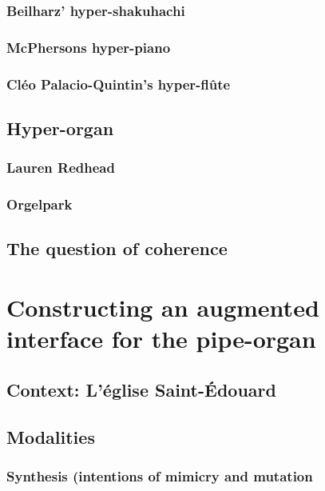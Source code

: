 \documentclass[12pt,twoside,maitrise]{dms}
\theoremstyle{definition}
\begin{document}
\subsection{Beilharz' hyper-shakuhachi}

\subsection{McPhersons hyper-piano}

\subsection{Cléo Palacio-Quintin's hyper-flûte}

\section{Hyper-organ}

\subsection{Lauren Redhead}

\subsection{Orgelpark}

\section{The question of coherence}

\chapter{Constructing an augmented interface for the pipe-organ}

\section{Context: L'église Saint-Édouard}

\section{Modalities}

\subsection{Synthesis (intentions of mimicry and mutation}
\end{document}
